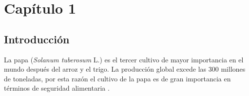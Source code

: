 
\chapter{Capítulo 1}
\section{Introducción}

La papa (\textit{Solanum tuberosum} L.) es el tercer cultivo de mayor importancia en el mundo después del arroz y el trigo. La producción global excede las 300 millones de toneladas, por esta razón el cultivo de la papa es de gran importancia en términos de seguridad alimentaria \citep{birch2012crops}.\\

